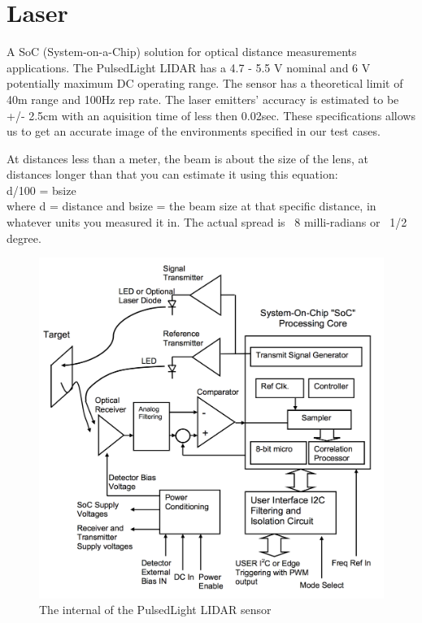 \clearpage
\section{Laser}

A SoC (System-on-a-Chip) solution for optical distance measurements applications. The PulsedLight LIDAR has a 4.7 - 5.5 V nominal and 6 V potentially maximum DC operating range. The sensor has a theoretical limit of 40m range and 100Hz rep rate. The laser emitters' accuracy is estimated to be +/- 2.5cm with an aquisition time of less then 0.02sec. These specifications allows us to get an accurate image of the environments specified in our test cases.


At distances less than a meter, the beam is about the size of the lens, at distances longer than that you can estimate it using this equation: 
\\ d/100 = bsize \\
where d = distance and bsize = the beam size at that specific distance, in whatever units you measured it in. The actual spread is ~8 milli-radians or ~1/2 degree. 


\begin{figure}[H]
	\centering
	\includegraphics[scale=.4]{images/internallidar.png}
	\caption{The internal of the PulsedLight LIDAR sensor}
	\label{fig:internallidar}
\end{figure}

